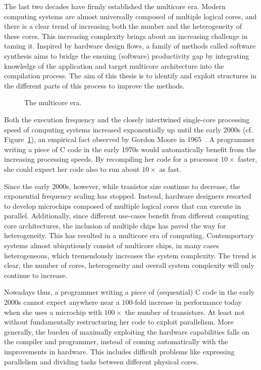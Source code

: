 The last two decades have firmly established the multicore era. Modern computing systems are almost universally composed of multiple logical cores, and there is a clear trend of increasing both the number and the heterogeneity of these cores. This increasing complexity brings about an increasing challenge in taming it. Inspired by hardware design flows, a family of methods called software synthesis aims to bridge the ensuing (software) productivity gap by integrating knowledge of the application and target multicore architecture into the compilation process. The aim of this thesis is to identify and exploit structures in the different parts of this process to improve the methods.

\begin{figure}[h]
	\centering
   \resizebox{0.55\textwidth}{!}{}
	\caption{The multicore era.} %
	\label{fig:multicore_era}
\end{figure}


Both the execution frequency and the closely intertwined single-core processing speed of computing systems increased exponentially up until the early 2000s (cf. Figure~\ref{fig:multicore_era}), an empirical fact observed by Gordon Moore in 1965~\cite{moore}. A programmer writing a piece of C code in the early 1970s would automatically benefit from the increasing processing speeds. By recompiling her code for a processor $10 \times$ faster, she could expect her code also to run about $10 \times$ as fast.%

Since the early 2000s, however, while tranistor size continue to decrease, the exponential frequency scaling has stopped. Instead, hardware designers resorted to develop microchips composed of multiple logical cores that can execute in parallel. Additionally, since different use-cases benefit from different computing core architectures, the inclusion of multiple chips has paved the way for heterogeneity. This has resulted in a multicore era of computing. Contemportary systems almost ubiqutiously consist of multicore chips, in many cases heterogeneous, which tremendously increases the system complexity. The trend is clear, the number of cores, heterogeneity and overall system complexity will only continue to increase.

Nowadays thus, a programmer writing a piece of (sequential) C code in the early 2000s cannot expect anywhere near a $100$-fold increase in performance today when she uses a microchip with $100 \times$ the number of transistors.
At least not without fundamentally restructuring her code to exploit parallelism.
More generally, the burden of maximally exploiting the hardware capabilities falls on the compiler and programmer, instead of coming automatically with the improvements in hardware.
This includes difficult problems like expressing parallelism and dividing tasks between different physical cores. %

